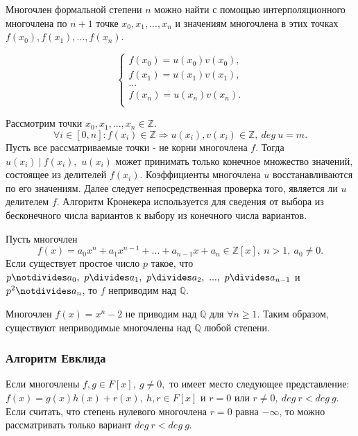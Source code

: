 \documentclass[12pt]{article}
\begin{document}
\begin{predp}
Многочлен формальной степени $n$ можно найти с помощью интерполяционного многочлена по $n + 1$ точке \mbox{$x_0, x_1, ..., x_{n}$} и значениям многочлена в этих точках \mbox{$f(x_0), f(x_1), ..., f(x_n)$.}
\end{predp}

$$\begin{cases}
f(x_0) = u(x_0)v(x_0), \\
f(x_1) = u(x_1)v(x_1), \\
... \\
f(x_n) = u(x_n)v(x_n). \\
\end{cases}$$

Рассмотрим точки $x_0, x_1, ..., x_{n} \in \mathbb{Z}$.
$$\forall i \in [0, n]: f(x_i) \in \mathbb{Z} \Rightarrow u(x_i), v(x_i) \in \mathbb{Z},~deg~u = m.$$
\hspace{0.6cm}Пусть все рассматриваемые точки - не корни многочлена $f$. Тогда $u(x_i)~|~f(x_i),$ $u(x_i)$ может принимать только конечное множество значений, состоящее из делителей $f(x_i)$. Коэффициенты многочлена $u$ восстанавливаются по его значениям. Далее следует непосредственная проверка того, является ли $u$ делителем $f$. Алгоритм Кронекера используется для сведения от выбора из бесконечного числа вариантов к выбору из конечного числа вариантов.  

\begin{thm}
Пусть многочлен $$f(x) = a_0x^n + a_1x^{n-1} + ... + a_{n-1}x + a_n \in \mathbb{Z}[x],~n > 1,~a_0 \neq 0.$$ Если существует простое число $p$ такое, что $p \notdivides a_0,~p \divides a_1,~p \divides a_2,~...,~p \divides a_{n - 1}$ и $p^2 \notdivides a_n$, то $f$ неприводим над $\mathbb{Q}$.
\end{thm}

\begin{examp}
Многочлен $f(x) = x^n - 2$ не приводим над $\mathbb{Q}$ для $\forall n \geq 1$. Таким образом, существуют неприводимые многочлены над $\mathbb{Q}$ любой степени.
\end{examp}

\subsubsection{Алгоритм Евклида}

\hspace{0.6cm}Если многочлены $f, g \in F[x],~g \neq 0,$ то имеет место следующее представление: \mbox{$f(x) = g(x)h(x) + r(x)$}$,~h, r \in F[x]$ и $r = 0$ или $r \neq 0,~deg~r < deg~g.$
Если считать, что степень нулевого многочлена $r = 0$ равна $-\infty$, то можно рассматривать только вариант $deg~r < deg~g$.
\end{document}
